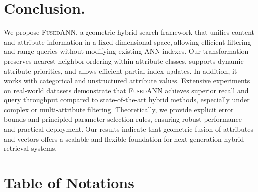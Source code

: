 \documentclass[numbers,sort]{article}
\begin{document}
\section{Conclusion.}
We propose \textsc{FusedANN}, a geometric hybrid search framework that unifies content and attribute information in a fixed-dimensional space, allowing efficient filtering and range queries without modifying existing ANN indexes. Our transformation preserves nearest-neighbor ordering within attribute classes, supports dynamic attribute priorities, and allows efficient partial index updates. In addition, it works with categorical and unstructured attribute values. Extensive experiments on real-world datasets demonstrate that \textsc{FusedANN} achieves superior recall and query throughput compared to state-of-the-art hybrid methods, especially under complex or multi-attribute filtering. Theoretically, we provide explicit error bounds and principled parameter selection rules, ensuring robust performance and practical deployment. Our results indicate that geometric fusion of attributes and vectors offers a scalable and flexible foundation for next-generation hybrid retrieval systems.


\nocite{*}






\newpage
\appendix
\startcontents


\newpage
\section{Table of Notations}
\end{document}
